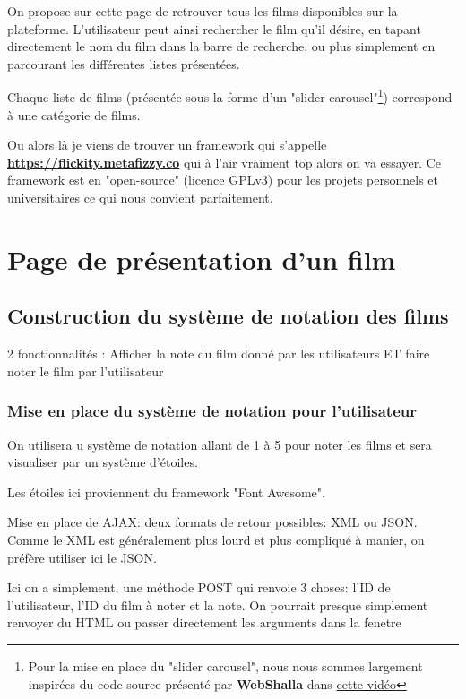 \documentclass[a4paper, 11pt]{MyReport}
\begin{document}
			On propose sur cette page de retrouver tous les films disponibles sur la plateforme. L'utilisateur peut ainsi rechercher le film qu'il désire, en tapant directement le nom du film dans la barre de recherche, ou plus simplement en parcourant les différentes listes présentées.

			Chaque liste de films (présentée sous la forme d'un "slider carousel"\footnote{Pour la mise en place du "slider carousel", nous nous sommes largement inspirées du code source présenté par {\bfseries WebShalla} dans \href{https://www.youtube.com/watch?v=Gi4CTYOs7J4}{cette vidéo} }) correspond à une catégorie de films.

			Ou alors là je viens de trouver un framework qui s'appelle {\bfseries \href{Flickity}{https://flickity.metafizzy.co} } qui à l'air vraiment top alors on va essayer. Ce framework est en "open-source" (licence GPLv3) pour les projets personnels et universitaires ce qui nous convient parfaitement.


		\section{Page de présentation d'un film}

			\subsection{Construction du système de notation des films}
				2 fonctionnalités : Afficher la note du film donné par les utilisateurs ET faire noter le film par l'utilisateur

				\subsubsection{Mise en place du système de notation pour l'utilisateur}

					On utilisera u système de notation allant de 1 à 5 pour noter les films et sera visualiser par un système d'étoiles.

					Les étoiles ici proviennent du framework "Font Awesome".

					\bigskip
					Mise en place de AJAX: deux formats de retour possibles: XML ou JSON. Comme le XML est généralement plus lourd et plus compliqué à manier, on préfère utiliser ici le JSON.

					Ici on a simplement, une méthode POST qui renvoie 3 choses: l'ID de l'utilisateur, l'ID du film à noter et la note. On pourrait presque simplement renvoyer du HTML ou passer directement les arguments dans la fenetre
\end{document}
